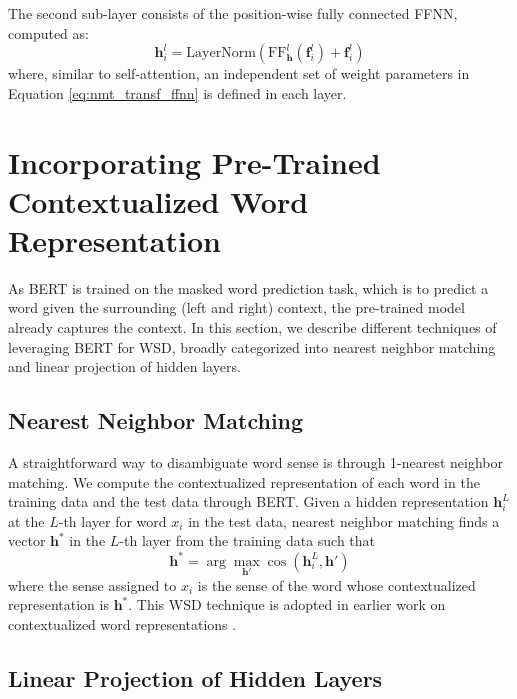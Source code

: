 \documentclass[11pt,a4paper]{article}
\begin{document}
The second sub-layer consists of the position-wise fully connected FFNN, computed as:
\begin{equation*}
\mathbf{h}^l_i = \text{LayerNorm}(\text{FF}^{l}_\mathbf{h}(\mathbf{f}^{l}_{i}) + \mathbf{f}^{l}_{i})
\end{equation*}
where, similar to self-attention, an independent set of weight parameters in Equation \ref{eq:nmt_transf_ffnn} is defined in each layer.

\section{Incorporating Pre-Trained Contextualized Word Representation}
\label{sec:incorporating}

As BERT is trained on the masked word prediction task, which is to predict a word given the surrounding (left and right) context, the pre-trained model already captures the context. In this section, we describe different techniques of leveraging BERT for WSD, broadly categorized into nearest neighbor matching and linear projection of hidden layers.

\subsection{Nearest Neighbor Matching}
\label{sec:incorporating_nearest}

A straightforward way to disambiguate word sense is through 1-nearest neighbor matching. We compute the contextualized representation of each word in the training data and the test data through BERT. Given a hidden representation $\mathbf{h}^L_{i}$ at the $L$-th layer for word $x_i$ in the test data, nearest neighbor matching finds a vector $\mathbf{h^*}$ in the $L$-th layer from the training data such that
\begin{equation}
\label{eq:nearest}
    \mathbf{h^*} = \arg\max_{\mathbf{h'}}{\cos(\mathbf{h}^L_{i},\mathbf{h'})}
\end{equation}
where the sense assigned to $x_i$ is the sense of the word whose contextualized representation is $\mathbf{h^*}$. This WSD technique is adopted in earlier work on contextualized word representations \cite{melamud_context2vec:_2016,peters_deep_2018}.

\subsection{Linear Projection of Hidden Layers}
\label{sec:incorporating_linear}
\end{document}
